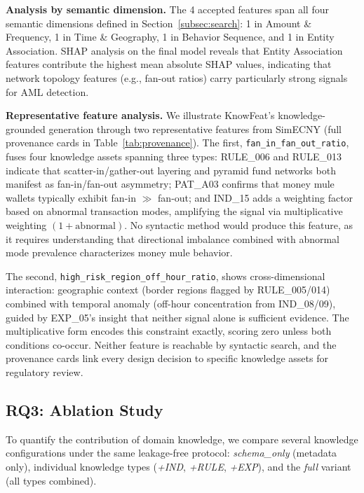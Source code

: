 \textbf{Analysis by semantic dimension.}
The 4 accepted features span all four semantic dimensions defined in Section~\ref{subsec:search}: 1 in Amount \& Frequency, 1 in Time \& Geography, 1 in Behavior Sequence, and 1 in Entity Association. SHAP analysis on the final model reveals that Entity Association features contribute the highest mean absolute SHAP values, indicating that network topology features (e.g., fan-out ratios) carry particularly strong signals for AML detection.

\textbf{Representative feature analysis.}
\label{sec:case_study}
We illustrate KnowFeat's knowledge-grounded generation through two representative features from SimECNY (full provenance cards in Table~\ref{tab:provenance}). The first, \texttt{fan\_in\_fan\_out\_\allowbreak{}ratio}, fuses four knowledge assets spanning three types: RULE\_006 and RULE\_013 indicate that scatter-in/gather-out layering and pyramid fund networks both manifest as fan-in/fan-out asymmetry; PAT\_A03 confirms that money mule wallets typically exhibit fan-in $\gg$ fan-out; and IND\_15 adds a weighting factor based on abnormal transaction modes, amplifying the signal via multiplicative weighting $(1 + \text{abnormal})$. No syntactic method would produce this feature, as it requires understanding that directional imbalance combined with abnormal mode prevalence characterizes money mule behavior.

The second, \texttt{high\_risk\_region\_\allowbreak{}off\_hour\_ratio}, shows cross-dimensional interaction: geographic context (border regions flagged by RULE\_005/014) combined with temporal anomaly (off-hour concentration from IND\_08/09), guided by EXP\_05's insight that neither signal alone is sufficient evidence. The multiplicative form encodes this constraint exactly, scoring zero unless both conditions co-occur. Neither feature is reachable by syntactic search, and the provenance cards link every design decision to specific knowledge assets for regulatory review.

\subsection{RQ3: Ablation Study}
\label{subsec:rq3}

To quantify the contribution of domain knowledge, we compare several knowledge configurations under the same leakage-free protocol: \textit{schema\_only} (metadata only), individual knowledge types (\textit{+IND}, \textit{+RULE}, \textit{+EXP}), and the \textit{full} variant (all types combined).


